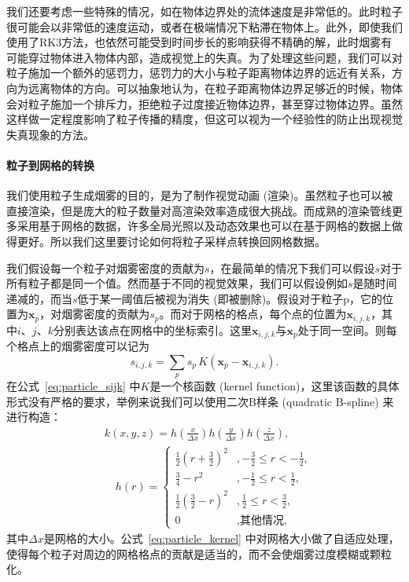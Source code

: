 我们还要考虑一些特殊的情况，如在物体边界处的流体速度是非常低的。此时粒子很可能会以非常低的速度运动，或者在极端情况下粘滞在物体上。此外，即使我们使用了RK3方法，也依然可能受到时间步长的影响获得不精确的解，此时烟雾有可能穿过物体进入物体内部，造成视觉上的失真。为了处理这些问题，我们可以对粒子施加一个额外的惩罚力，惩罚力的大小与粒子距离物体边界的远近有关系，方向为远离物体的方向。可以抽象地认为，在粒子距离物体边界足够近的时候，物体会对粒子施加一个排斥力，拒绝粒子过度接近物体边界，甚至穿过物体边界。虽然这样做一定程度影响了粒子传播的精度，但这可以视为一个经验性的防止出现视觉失真现象的方法。

\paragraph{粒子到网格的转换}
我们使用粒子生成烟雾的目的，是为了制作视觉动画 (渲染)。虽然粒子也可以被直接渲染，但是庞大的粒子数量对高渲染效率造成很大挑战。而成熟的渲染管线更多采用基于网格的数据，许多全局光照以及动态效果也可以在基于网格的数据上做得更好。所以我们这里要讨论如何将粒子采样点转换回网格数据。

我们假设每一个粒子对烟雾密度的贡献为$s$，在最简单的情况下我们可以假设$s$对于所有粒子都是同一个值。然而基于不同的视觉效果，我们可以假设例如$s$是随时间递减的，而当$s$低于某一阈值后被视为消失 (即被删除)。假设对于粒子p，它的位置为$\mathbf{x}_p$，对烟雾密度的贡献为$s_p$。而对于网格的格点，每个点的位置为$\mathbf{x}_{i,j,k}$，其中$i$、$j$、$k$分别表达该点在网格中的坐标索引。这里$\mathbf{x}_{i,j,k}$与$\mathbf{x}_p$处于同一空间。则每个格点上的烟雾密度可以记为
\begin{equation}
    s_{i,j,k}=\sum_p s_p \, K(\mathbf{x}_p-\mathbf{x}_{i,j,k}).
    \label{eq:particle_sijk}
\end{equation}
在公式~\ref{eq:particle_sijk} 中$K$是一个核函数 (kernel function)，这里该函数的具体形式没有严格的要求，举例来说我们可以使用二次B样条 (quadratic B-spline) 来进行构造：
\begin{align}
\label{eq:particle_kernel}
& k(x, y, z)= h\left(\frac{x}{\Delta x}\right) h\left(\frac{y}{\Delta x}\right) h\left(\frac{z}{\Delta x}\right), \\
& \quad h(r)=\left\{\begin{array}{cl}
\frac{1}{2}\left(r+\frac{3}{2}\right)^{2} & ,-\frac{3}{2} \leq r<-\frac{1}{2}, \\
\frac{3}{4}-r^{2} & ,-\frac{1}{2} \leq r<\frac{1}{2}, \\
\frac{1}{2}\left(\frac{3}{2}-r\right)^{2} & ,\frac{1}{2} \leq r<\frac{3}{2}, \\
0 & , \text {其他情况,}
\end{array}\right.
\end{align}
其中$\Delta x$是网格的大小。公式~\ref{eq:particle_kernel} 中对网格大小做了自适应处理，使得每个粒子对周边的网格格点的贡献是适当的，而不会使烟雾过度模糊或颗粒化。

